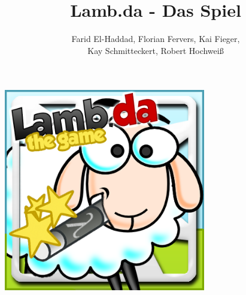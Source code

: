 \documentclass[parskip=full]{scrartcl}
\title{Lamb.da - Das Spiel}
\author{ 	
Farid El-Haddad,  Florian Fervers,  Kai Fieger,
\\
Kay Schmitteckert, Robert Hochweiß
}
\begin{document}
\maketitle
	\begin{center}
	\includegraphics[width=250pt]{../gui/icon.png}
	\end{center}
	
\newpage
\tableofcontents
\newpage

\newpage

\newpage

\newpage

\newpage

\newpage

\newpage

\newpage

\newpage

\newpage

\newpage

\newpage

\end{document}
